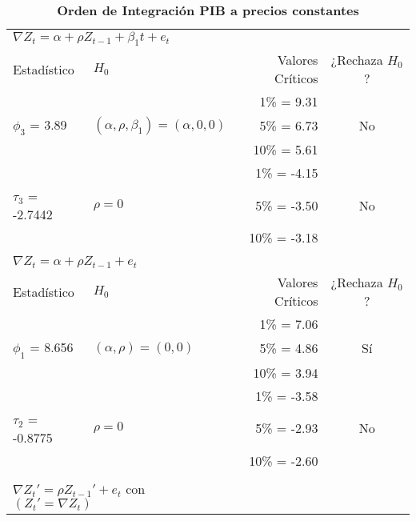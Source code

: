\begin{table}[ht]
\caption{\textbf{Orden de Integración PIB a precios constantes}}
\centering
	\begin{tabular}{llrc}
	\multicolumn{2}{l}{$\nabla Z_t = \alpha + \rho Z_{t-1} + \beta_1 t + e_t$} \\
	\cline{1-2}
		Estadístico    			& $H_0$ 							& Valores Críticos 	& ¿Rechaza $H_0$? \\
		\hline
							&								& 1\%   = 9.31		&			\\
		 $\phi_3$ = 3.89		& $(\alpha, \rho, \beta_1)=(\alpha,0,0)$     & 5\%   = 6.73		&       No		\\
							&  								& 10\% = 5.61		&       		\\
	\cline{1-4}				
							&								& 1\%   = -4.15		&			\\
		 $\tau_3$ = -2.7442		& $\rho=0$						& 5\%   = -3.50		&       No		\\
							&  								& 10\% = -3.18		&       		\\
	\firsthline
							&								&				&			\\
	\multicolumn{2}{l}{$\nabla Z_t = \alpha + \rho Z_{t-1} + e_t$} \\
	\cline{1-2}
		Estadístico    			& $H_0$ 							& Valores Críticos 	& ¿Rechaza $H_0$? \\
		\hline
							&								& 1\%   = 7.06		&			\\
		 $\phi_1$ = 8.656		& $(\alpha, \rho)=(0,0)$     			& 5\%   = 4.86		&       Sí		\\
							&  								& 10\% = 3.94		&       		\\
	\cline{1-4}				
							&								& 1\%   = -3.58		&			\\
		 $\tau_2$ = -0.8775		& $\rho=0$						& 5\%   = -2.93		&       No		\\
							&  								& 10\% = -2.60		&       		\\
	\firsthline
							&								&				&			\\
	\multicolumn{2}{l}{$\nabla Z_t' = \rho Z_{t-1}' + e_t$ con $(Z_t'=\nabla Z_t)$} \\

\end{tabular}
\end{table}
